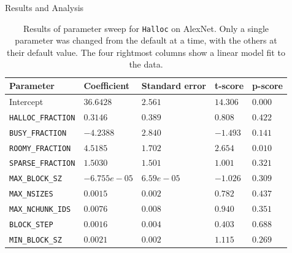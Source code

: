 \documentclass[10pt]{beamer}
\begin{document}
\begin{frame}[fragile]{Results and Analysis}



\begin{table}[!ht]
\centering
\small
\caption{Results of parameter sweep for \texttt{Halloc} on AlexNet. Only a single parameter was changed from the default at a time, with the others at their default value. The four rightmost columns show a linear model fit to the data.}
\vspace{-10pt}
\label{tab:parametersweep}
\begin{tabular}{|l|l|l|l|l|}
\hline
\textbf{Parameter}        & \textbf{Coefficient} & \textbf{Standard error} & \textbf{t-score} & \textbf{p-score} \\ \hline
Intercept                 & $36.6428$     & $2.561$          & $14.306$  & $0.000$   \\ \hline
\texttt{HALLOC\_FRACTION} & $0.3146$      & $0.389$          & $0.808$   & $0.422$   \\ \hline
\texttt{BUSY\_FRACTION}   & $-4.2388$     & $2.840$          & $-1.493$  & $0.141$   \\ \hline
\texttt{ROOMY\_FRACTION}  & $4.5185$      & $1.702$          & $2.654$   & $0.010$   \\ \hline
\texttt{SPARSE\_FRACTION} & $1.5030$      & $1.501$          & $1.001$   & $0.321$   \\ \hline
\texttt{MAX\_BLOCK\_SZ}   & $-6.755e-05$  & $6.59e-05$       & $-1.026$  & $0.309$   \\ \hline
\texttt{MAX\_NSIZES}      & $0.0015$      & $0.002$          & $0.782$   & $0.437$   \\ \hline
\texttt{MAX\_NCHUNK\_IDS} & $0.0076$      & $0.008$          & $0.940$   & $0.351$   \\ \hline
\texttt{BLOCK\_STEP}      & $0.0016$      & $0.004$          & $0.403$   & $0.688$   \\ \hline
\texttt{MIN\_BLOCK\_SZ}   & $0.0021$      & $0.002$          & $1.115$   & $0.269$   \\ \hline
\end{tabular}
\end{table}

\end{frame}

\end{document}
